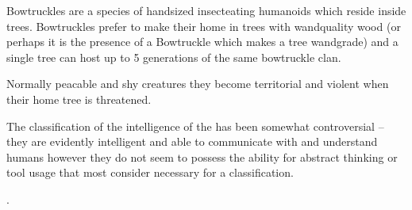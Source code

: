 {
	Bowtruckles are a species of hand\minus{}sized\comma{} insect\minus{}eating humanoids which reside inside trees. Bowtruckles prefer to make their home in trees with wand\minus{}quality wood (or perhaps\comma{} it is the presence of a Bowtruckle which makes a tree wand\minus{}grade)\comma{} and a single tree can host up to 5 generations of the same bowtruckle clan. 

Normally peacable and shy creatures\comma{} they become territorial and violent when their home tree is threatened. 

The classification of the intelligence of the  has been somewhat controversial – they are evidently intelligent and able to communicate with and understand humans\comma{} however they do not seem to possess the ability for abstract thinking or tool usage that most consider necessary for a  classification. 


. 

}

